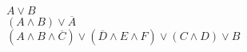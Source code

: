 \documentclass[preview]{standalone}
\begin{document}
\begin{center}
${A\lor B}$ \\ ${\displaystyle (A\land B)\lor {\overline {A}}}$ \\ ${\displaystyle (A\land B\land {\overline {C}})\lor ({\overline {D}}\land E\land F)\lor (C\land D)\lor B}$
\end{center}
\end{document}
